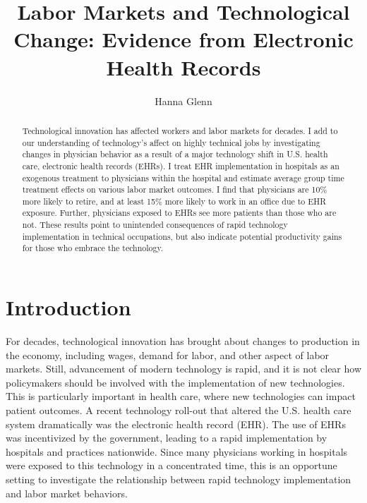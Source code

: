 \documentclass[12pt]{article}
\title{Labor Markets and Technological Change: Evidence from Electronic Health Records}
\author{Hanna Glenn}
\begin{document}
\maketitle

\begin{abstract}
    Technological innovation has affected workers and labor markets for decades. I add to our understanding of technology's affect on highly technical jobs by investigating changes in physician behavior as a result of a major technology shift in U.S. health care, electronic health records (EHRs). I treat EHR implementation in hospitals as an exogenous treatment to physicians within the hospital and estimate average group time treatment effects on various labor market outcomes. I find that physicians are 10\% more likely to retire, and at least 15\% more likely to work in an office due to EHR exposure. Further, physicians exposed to EHRs see more patients than those who are not. These results point to unintended consequences of rapid technology implementation in technical occupations, but also indicate potential productivity gains for those who embrace the technology.
\end{abstract}

\vspace{1.5cm}

\section{Introduction}
For decades, technological innovation has brought about changes to production in the economy, including wages, demand for labor, and other aspect of labor markets. Still, advancement of modern technology is rapid, and it is not clear how policymakers should be involved with the implementation of new technologies. This is particularly important in health care, where new technologies can impact patient outcomes. A recent technology roll-out that altered the U.S. health care system dramatically was the electronic health record (EHR). The use of EHRs was incentivized by the government, leading to a rapid implementation by hospitals and practices nationwide. Since many physicians working in hospitals were exposed to this technology in a concentrated time, this is an opportune setting to investigate the relationship between rapid technology implementation and labor market behaviors. 
\end{document}
